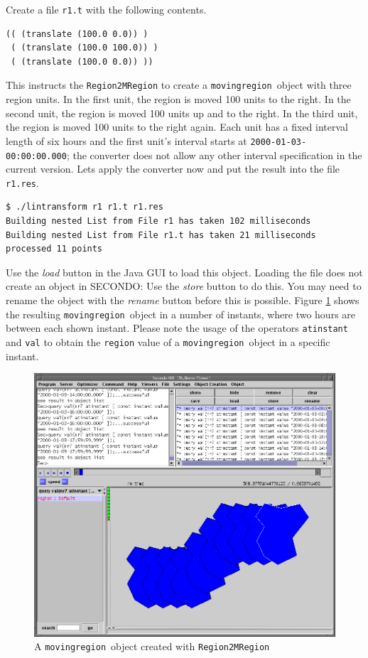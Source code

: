 \documentclass[a4paper,12pt]{article}
\newcommand{\secondo}{{\scshape SE\-CON\-DO}}
\newcommand{\mr}{{\tt movingregion}}
\begin{document}
Create a file {\tt r1.t} with the following contents.
\begin{verbatim}
(( (translate (100.0 0.0)) )
 ( (translate (100.0 100.0)) )
 ( (translate (100.0 0.0)) ))
\end{verbatim}
This instructs the {\tt Region2MRegion} to create a \mr\ object with
three region units. In the first unit, the region is moved 100 units
to the right. In the second unit, the region is moved 100 units up and
to the right. In the third unit, the region is moved 100 units to the
right again. Each unit has a fixed interval length of six hours and the first
unit's interval starts at {\tt 2000-01-03-00:00:00.000}; the converter does
not allow any other interval specification in the current version.
Lets apply the converter now and put the result into the
file {\tt r1.res}.
\begin{verbatim}
$ ./lintransform r1 r1.t r1.res
Building nested List from File r1 has taken 102 milliseconds
Building nested List from File r1.t has taken 21 milliseconds
processed 11 points
\end{verbatim}
Use the {\em load} button in the Java GUI to load this object. Loading
the file does not create an object in \secondo: Use the {\em store} button
to do this. You may need to rename the object with the {\em rename} button
before this is possible. Figure \ref{creating:r2mr1} shows the resulting
\mr\ object in a number of instants, where two hours are between each
shown instant. Please note the usage of the operators {\tt atinstant} and
{\tt val} to obtain the {\tt region} value of a \mr\ object in a specific
instant.
\begin{figure}
  \begin{center}
    \includegraphics[scale=0.4]{screenshot02.png}
  \end{center}
  \caption{A \mr\ object created with {\tt Region2MRegion}}
  \label{creating:r2mr1}
\end{figure}
\end{document}
